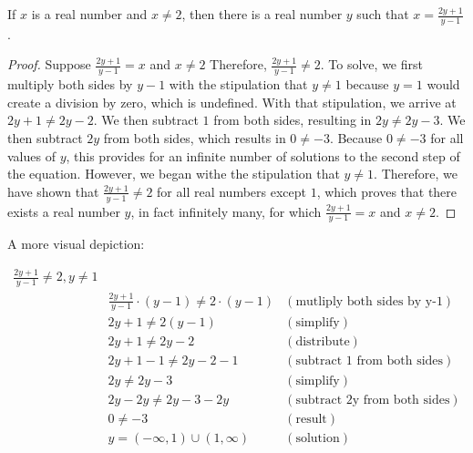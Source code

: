 
\begin{theorem}
  If $x$ is a real number and $x \ne 2$, then there is a real number $y$ such
  that $x = \frac{2y+1}{y-1}$.
\end{theorem}

\begin{proof}
  Suppose $\frac{2y+1}{y-1} = x$ and $x \ne 2$ Therefore, $\frac{2y+1}{y-1}
  \ne 2$. To solve, we first multiply both sides by $y-1$ with the stipulation
  that $y \ne 1$ because $y = 1$ would create a division by zero, which is
  undefined. With that stipulation, we arrive at $2y+1\ne 2y-2$. We then
  subtract $1$ from both sides, resulting in $2y \ne 2y-3$. We then subtract
  $2y$ from both sides, which results in $0 \ne -3$. Because $0 \ne -3$ for
  all values of $y$, this provides for an infinite number of solutions to the
  second step of the equation. However, we began withe the stipulation that $y
  \ne 1$. Therefore, we have shown that $\frac{2y+1}{y-1} \ne 2$ for all real
  numbers except $1$, which proves that there exists a real number $y$, in
  fact infinitely many, for which $\frac{2y+1}{y-1}=x$ and $x \ne 2$.
\end{proof}

A more visual depiction:

\begin{align*}
  \frac{2y+1}{y-1} \ne 2, y \ne 1\\
        &\frac{2y+1}{y-1} \cdot (y-1) \ne 2 \cdot (y-1)&(\textrm{mutliply both sides by y-1})\\
        &2y+1 \ne 2(y-1) &(\textrm{simplify})\\
        &2y+1 \ne 2y-2 &(\textrm{distribute})\\
        &2y+1-1 \ne 2y-2-1 &(\textrm{subtract 1 from both sides})\\
        &2y \ne 2y-3 &(\textrm{simplify})\\
        &2y-2y \ne 2y-3-2y &(\textrm{subtract 2y from both sides})\\
        &0 \ne -3 &(\textrm{result})\\
        &y = (-\infty, 1)\cup(1,\infty) &(\textrm{solution})
\end{align*}
